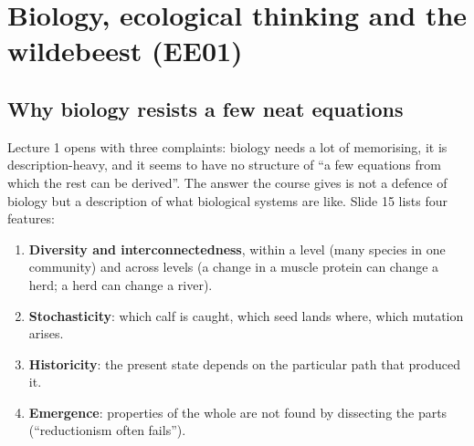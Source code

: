 \section{Biology, ecological thinking and the wildebeest (EE01)}

\subsection{Why biology resists a few neat equations}
Lecture 1 opens with three complaints: biology needs a lot of memorising, it is description-heavy, and it seems
to have no structure of ``a few equations from which the rest can be derived''. The answer the course gives is not
a defence of biology but a description of what biological systems are like. Slide 15 lists four features:

\begin{enumerate}
\item \textbf{Diversity and interconnectedness}, within a level (many species in one community) and across levels
(a change in a muscle protein can change a herd; a herd can change a river).
\item \textbf{Stochasticity}: which calf is caught, which seed lands where, which mutation arises.
\item \textbf{Historicity}: the present state depends on the particular path that produced it.
\item \textbf{Emergence}: properties of the whole are not found by dissecting the parts (``reductionism often fails'').
\end{enumerate}

